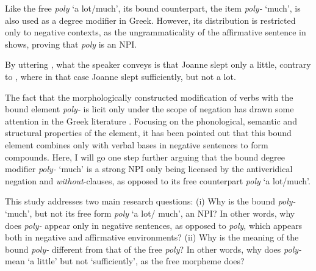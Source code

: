 \documentclass[output=paper]{langscibook}
\begin{document}
Like the free \textit{poly} ‘a lot/much’, its bound counterpart, the item \textit{poly-} ‘much’, is also used as a degree modifier in Greek. However, its distribution is restricted only to negative contexts, as the ungrammaticality of the affirmative sentence in  shows, proving that \textit{poly} is an NPI.

\begin{exe}
\ex\label{gia:ex3} \begin{xlist}
        \label{gia:ex3a}
        \label{gia:ex3b}
    \end{xlist}
\end{exe}

\noindent By uttering , what the speaker conveys is that Joanne slept only a little, contrary to , where in that case Joanne slept sufficiently, but not a lot.

The fact that the morphologically constructed modification of verbs with the bound element \textit{poly-} is licit only under the scope of negation has drawn some attention in the Greek literature \citep{delvevass1999,efthimiougavriili2003,ralli2004,dimelameli2009}. Focusing on the phonological, semantic and structural properties of the element, it has been pointed out that this bound element combines only with verbal bases in negative sentences to form compounds. Here, I will go one step further arguing that the bound degree modifier \textit{poly-} `much' is a strong NPI only being licensed by the antiveridical negation and \textit{without}-clauses, as opposed to its free counterpart \textit{poly} `a lot/much'.

This study addresses two main research questions: (i) Why is the bound \textit{poly-} ‘much’, but not its free form \textit{poly} ‘a lot/ much’, an NPI? In other words, why does \textit{poly-} appear only in negative sentences, as opposed to \textit{poly}, which appears both in negative and affirmative environments? (ii) Why is the meaning of the bound \textit{poly-} different from that of the free \textit{poly}? In other words, why does \textit{poly-} mean ‘a little’ but not ‘sufficiently’, as the free morpheme does?
\end{document}

